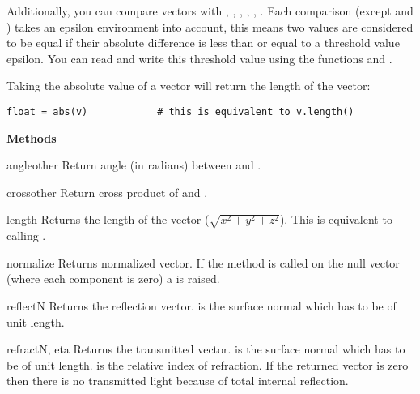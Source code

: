 Additionally, you can compare vectors with \code{==}, \code{!=}, \code{<}, 
\code{<=}, \code{>}, \code{>=}. Each
comparison (except \code{<} and \code{>}) takes an epsilon environment
into account, this means two values are considered to be equal if
their absolute difference is less than or equal to a threshold value
epsilon. You can read and write this threshold value using the
functions  and .

Taking the absolute value of a vector will return the length of the vector: 

\begin{verbatim}
float = abs(v)            # this is equivalent to v.length()
\end{verbatim}

{\bf Methods}

\begin{methoddesc}{angle}{other}
Return angle (in radians) between  and .
\end{methoddesc}

\begin{methoddesc}{cross}{other}
Return cross product of  and .
\end{methoddesc}

\begin{methoddesc}{length}{}
Returns the length of the vector ($\sqrt{x^2+y^2+z^2}$). This is
equivalent to calling .
\end{methoddesc}

\begin{methoddesc}{normalize}{}
Returns normalized vector. If the method is called on the null vector
(where each component is zero) a  is raised.
\end{methoddesc}

\begin{methoddesc}{reflect}{N}
Returns the reflection vector.  is the surface normal which has to be
of unit length.
\end{methoddesc}

\begin{methoddesc}{refract}{N, eta}
Returns the transmitted vector.  is the surface normal which has to
be of unit length.  is the relative index of refraction. If the
returned vector is zero then there is no transmitted light because of
total internal reflection.
\end{methoddesc}


